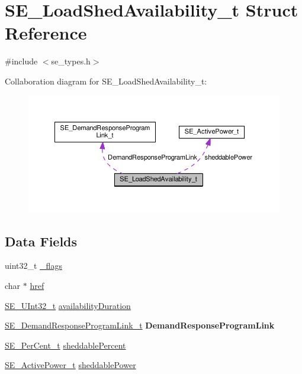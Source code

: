 \hypertarget{structSE__LoadShedAvailability__t}{}\section{S\+E\+\_\+\+Load\+Shed\+Availability\+\_\+t Struct Reference}
\label{structSE__LoadShedAvailability__t}


{\ttfamily \#include $<$se\+\_\+types.\+h$>$}



Collaboration diagram for S\+E\+\_\+\+Load\+Shed\+Availability\+\_\+t\+:\nopagebreak
\begin{figure}[H]
\begin{center}
\leavevmode
\includegraphics[width=350pt]{structSE__LoadShedAvailability__t__coll__graph}
\end{center}
\end{figure}
\subsection*{Data Fields}
\begin{DoxyCompactItemize}
\item 
uint32\+\_\+t \hyperlink{group__LoadShedAvailability_ga404541fef1f866fbfc92c7f236622e07}{\+\_\+flags}
\item 
char $\ast$ \hyperlink{group__LoadShedAvailability_ga09ec435977ecddd0dc707dec6818d08e}{href}
\item 
\hyperlink{group__UInt32_ga70bd4ecda3c0c85d20779d685a270cdb}{S\+E\+\_\+\+U\+Int32\+\_\+t} \hyperlink{group__LoadShedAvailability_ga200cb55232c00f729b128f5414767e00}{availability\+Duration}
\item 
\hyperlink{structSE__DemandResponseProgramLink__t}{S\+E\+\_\+\+Demand\+Response\+Program\+Link\+\_\+t} {\bfseries Demand\+Response\+Program\+Link}
\item 
\hyperlink{group__PerCent_ga14278cbee754c63496035b722b417ddc}{S\+E\+\_\+\+Per\+Cent\+\_\+t} \hyperlink{group__LoadShedAvailability_ga884487f6c05e859588d1880d494aa5eb}{sheddable\+Percent}
\item 
\hyperlink{structSE__ActivePower__t}{S\+E\+\_\+\+Active\+Power\+\_\+t} \hyperlink{group__LoadShedAvailability_ga1a6b6f3e9fc1c6520221cce4af77712f}{sheddable\+Power}
\end{DoxyCompactItemize}


